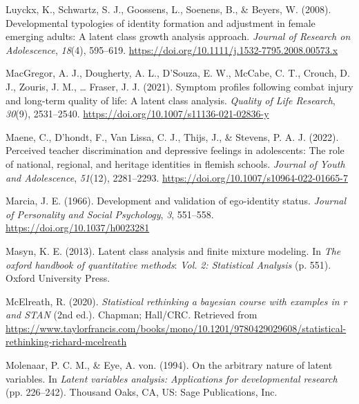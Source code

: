 \documentclass[
  ,man,floatsintext]{apa6}
\newlength{\cslhangindent}
\newlength{\cslentryspacingunit} %
\newenvironment{CSLReferences}[2] %
 {%
  \setlength{\parindent}{0pt}
  \ifodd #1
  \let\oldpar\par
  \def\par{\hangindent=\cslhangindent\oldpar}
  \fi
  \setlength{\parskip}{#2\cslentryspacingunit}
 }%
 {}
\begin{document}
\begin{CSLReferences}{1}{0}
\leavevmode{}%
Luyckx, K., Schwartz, S. J., Goossens, L., Soenens, B., \& Beyers, W. (2008). Developmental typologies of identity formation and adjustment in female emerging adults: A latent class growth analysis approach. \emph{Journal of Research on Adolescence}, \emph{18}(4), 595--619. \url{https://doi.org/10.1111/j.1532-7795.2008.00573.x}

\leavevmode{}%
MacGregor, A. J., Dougherty, A. L., D'Souza, E. W., McCabe, C. T., Crouch, D. J., Zouris, J. M., \ldots{} Fraser, J. J. (2021). Symptom profiles following combat injury and long-term quality of life: A latent class analysis. \emph{Quality of Life Research}, \emph{30}(9), 2531--2540. \url{https://doi.org/10.1007/s11136-021-02836-y}

\leavevmode{}%
Maene, C., D'hondt, F., Van Lissa, C. J., Thijs, J., \& Stevens, P. A. J. (2022). Perceived teacher discrimination and depressive feelings in adolescents: The role of national, regional, and heritage identities in flemish schools. \emph{Journal of Youth and Adolescence}, \emph{51}(12), 2281--2293. \url{https://doi.org/10.1007/s10964-022-01665-7}

\leavevmode{}%
Marcia, J. E. (1966). Development and validation of ego-identity status. \emph{Journal of Personality and Social Psychology}, \emph{3}, 551--558. \url{https://doi.org/10.1037/h0023281}

\leavevmode{}%
Masyn, K. E. (2013). Latent class analysis and finite mixture modeling. In \emph{The oxford handbook of quantitative methods}: \emph{Vol.} \emph{2: Statistical Analysis} (p. 551). Oxford University Press.

\leavevmode{}%
McElreath, R. (2020). \emph{Statistical rethinking {\textbar} a bayesian course with examples in r and {STAN}} (2nd ed.). Chapman; Hall/{CRC}. Retrieved from \url{https://www.taylorfrancis.com/books/mono/10.1201/9780429029608/statistical-rethinking-richard-mcelreath}

\leavevmode{}%
Molenaar, P. C. M., \& Eye, A. von. (1994). On the arbitrary nature of latent variables. In \emph{Latent variables analysis: Applications for developmental research} (pp. 226--242). Thousand Oaks, {CA}, {US}: Sage Publications, Inc.


\end{CSLReferences}
\end{document}
